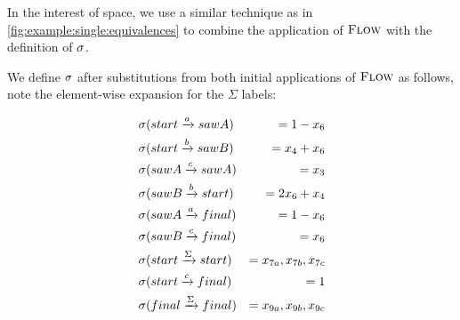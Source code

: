 \documentclass[acmsmall,review,anonymous,screen]{acmart}\settopmatter{printfolios=true,printccs=false,printacmref=true}
\theoremstyle{definition}
\begin{document}
In the interest of space, we use a similar technique as in
\cref{fig:example:single:equivalences} to combine the application of $\textsc{Flow}$
with the definition of $\operatorname{\sigma}$.

  We define $\operatorname{\sigma}$ after substitutions from both initial applications of
  $\textsc{Flow}$ as follows, note the element-wise expansion for the $\Sigma$ labels:

    \begin{equation*}
      \begin{aligned}
        & \operatorname{\sigma}(start \xrightarrow{a} sawA) & = 1 - x_6 \\
        & \operatorname{\sigma}(start \xrightarrow{b} sawB) & = x_4 + x_6 \\
        & \operatorname{\sigma}(sawA \xrightarrow{c} sawA)  & = x_3  \\
        & \operatorname{\sigma}(sawB \xrightarrow{b} start) & = 2x_6 + x_4 \\
        & \operatorname{\sigma}(sawA \xrightarrow{a} final) & = 1 - x_6 \\
        & \operatorname{\sigma}(sawB \xrightarrow{c} final) & = x_6 \\
        & \operatorname{\sigma}(start \xrightarrow{\Sigma} start) & = x_{7a}, x_{7b}, x_{7c} \\
        & \operatorname{\sigma}(start \xrightarrow{c} final) & = 1 \\
        & \operatorname{\sigma}(final \xrightarrow{\Sigma} final) & = x_{9a}, x_{9b}, x_{9c} \\
      \end{aligned}
    \end{equation*}
    
\end{document}
